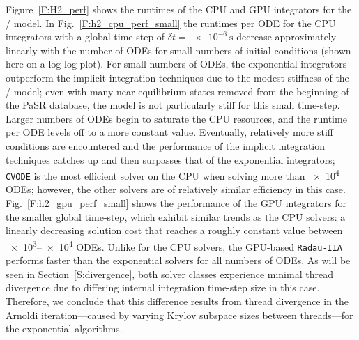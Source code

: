 \documentclass[preprint]{elsarticle}
\begin{document}
Figure~\ref{F:H2_perf} shows the runtimes of the CPU and GPU integrators for the \slash{} model.
In Fig.~\ref{F:h2_cpu_perf_small} the runtimes per ODE for the CPU integrators with a global time-step of $\delta t= \SI{e-6}{\second}$ decrease approximately linearly with the number of ODEs for small numbers of initial conditions (shown here on a log-log plot).
For small numbers of ODEs, the exponential integrators outperform the implicit integration techniques due to the modest stiffness of the \slash{} model; even with many near-equilibrium states removed from the beginning of the PaSR database, the model is not particularly stiff for this small time-step.
Larger numbers of ODEs begin to saturate the CPU resources, and the runtime per ODE levels off to a more constant value.
Eventually, relatively more stiff conditions are encountered and the performance of the implicit integration techniques catches up and then surpasses that of the exponential integrators; \texttt{CVODE} is the most efficient solver on the CPU when solving more than \num{e4} ODEs; however, the other solvers are of relatively similar efficiency in this case.
Fig.~\ref{F:h2_gpu_perf_small} shows the performance of the GPU integrators for the smaller global time-step, which exhibit similar trends as the CPU solvers: a linearly decreasing solution cost that reaches a roughly constant value between \numrange{e3}{e4} ODEs.
Unlike for the CPU solvers, the GPU-based \texttt{Radau-IIA} performs faster than the exponential solvers for all numbers of ODEs.
As will be seen in Section~\ref{S:divergence}, both solver classes experience minimal thread divergence due to differing internal integration time-step size in this case.
Therefore, we conclude that this difference results from thread divergence in the Arnoldi iteration---caused by varying Krylov subspace sizes between threads---for the exponential algorithms.
\end{document}
